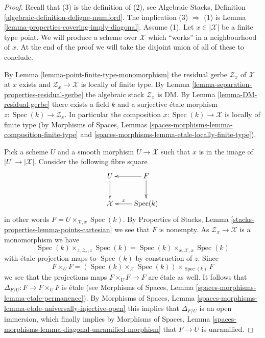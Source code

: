 \documentclass[10pt,a4paper]{amsart}
\theoremstyle{plain}
\theoremstyle{definition}
\theoremstyle{remark}
\numberwithin{equation}{subsection}
\def\Spec{\mathop{\mathrm{Spec}}}
\begin{document}
\begin{proof}
Recall that (3) is the definition of (2), see
Algebraic Stacks, Definition \ref{algebraic-definition-deligne-mumford}.
The implication (3) $\Rightarrow$ (1) is
Lemma \ref{lemma-properties-covering-imply-diagonal}.
Assume (1). Let $x \in |\mathcal{X}|$ be a finite type point.
We will produce a scheme over $\mathcal{X}$ which ``works'' in a
neighbourhood of $x$. At the end of the proof we will take the disjoint
union of all of these to conclude.

\medskip\noindent
By
Lemma \ref{lemma-point-finite-type-monomorphism}
the residual gerbe $\mathcal{Z}_x$ of $\mathcal{X}$ at $x$ exists and
$\mathcal{Z}_x \to \mathcal{X}$ is locally of finite type. By
Lemma \ref{lemma-separation-properties-residual-gerbe}
the algebraic stack $\mathcal{Z}_x$ is DM. By
Lemma \ref{lemma-DM-residual-gerbe}
there exists a field $k$ and a surjective \'etale morphism
$z : \Spec(k) \to \mathcal{Z}_x$.
In particular the composition $x : \Spec(k) \to \mathcal{X}$
is locally of finite type (by
Morphisms of Spaces, Lemmas
\ref{spaces-morphisms-lemma-composition-finite-type} and
\ref{spaces-morphisms-lemma-etale-locally-finite-type}).

\medskip\noindent
Pick a scheme $U$ and a smooth morphism $U \to \mathcal{X}$ such that
$x$ is in the image of $|U| \to |\mathcal{X}|$.
Consider the following fibre square
$$
\xymatrix{
U \ar[d] & F  \ar[l] \ar[d] \\
\mathcal{X} & \Spec(k) \ar[l]_-x
}
$$
in other words $F = U \times_{\mathcal{X}, x} \Spec(k)$. By
Properties of Stacks, Lemma \ref{stacks-properties-lemma-points-cartesian}
we see that $F$ is nonempty.
As $\mathcal{Z}_x \to \mathcal{X}$ is a monomorphism we have
$$
\Spec(k) \times_{z, \mathcal{Z}_x, z} \Spec(k)
=
\Spec(k) \times_{x, \mathcal{X}, x} \Spec(k)
$$
with \'etale projection maps to $\Spec(k)$ by construction of $z$.
Since
$$
F \times_U F =
(\Spec(k) \times_\mathcal{X} \Spec(k))
\times_{\Spec(k)} F
$$
we see that the projections maps $F \times_U F \to F$ are \'etale as well.
It follows that $\Delta_{F/U} : F \to F \times_U F$ is \'etale (see
Morphisms of Spaces, Lemma \ref{spaces-morphisms-lemma-etale-permanence}).
By
Morphisms of Spaces, Lemma
\ref{spaces-morphisms-lemma-etale-universally-injective-open}
this implies that $\Delta_{F/U}$ is an open immersion, which finally
implies by
Morphisms of Spaces, Lemma
\ref{spaces-morphisms-lemma-diagonal-unramified-morphism}
that $F \to U$ is unramified.


\end{proof}
\end{document}
